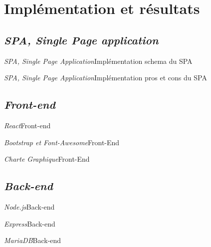 \documentclass[usenames,dvipsnames]{beamer}
\begin{document}
\section{Implémentation et résultats}
\subsection{\protect\textit{SPA, Single Page application}}
\begin{frame}{\textit{SPA, Single Page Application}}{Implémentation}
    schema du SPA
\end{frame}

\begin{frame}{\textit{SPA, Single Page Application}}{Implémentation}
    pros et cons du SPA
\end{frame}


\subsection{\protect\textit{Front-end}}
\begin{frame}{\textit{React}}{Front-end}

\end{frame}

\begin{frame}{\textit{Bootstrap et Font-Awesome}}{Front-End}

\end{frame}

\begin{frame}{\textit{Charte Graphique}}{Front-End}

\end{frame}

\subsection{\protect\textit{Back-end}}
\begin{frame}{\textit{Node.js}}{Back-end}

\end{frame}

\begin{frame}{\textit{Express}}{Back-end}

\end{frame}

\begin{frame}{\textit{MariaDB}}{Back-end}

\end{frame}

\end{document}
